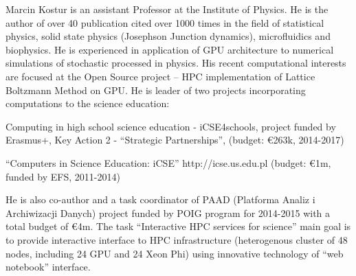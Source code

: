 \begin{participant}[type=leadPI,PM=12,salary=2000,gender=male]{Marcin Kostur}
is an assistant Professor at the Institute of Physics. He is the author of over 40
publication cited over 1000 times in the field of statistical physics,
solid state physics (Josephson Junction dynamics), microfluidics and
biophysics. He is experienced in application of GPU architecture to
numerical simulations of stochastic processed in physics. His recent
computational interests are focused at the Open Source project
 -- HPC implementation of Lattice Boltzmann Method on GPU.
He is leader of two projects incorporating computations to the science education:
\begin{compactitem}
\item Computing in high school science education - iCSE4schools,
  project funded by Erasmus+, Key Action 2 - ``Strategic Partnerships'',
  (budget: \euro{263}k, 2014-2017)
\item ``Computers in Science Education: iCSE'' http://icse.us.edu.pl
  (budget: \euro{1}m, funded by EFS, 2011-2014)
\end{compactitem}
He is also co-author and a task coordinator of PAAD (Platforma Analiz i
Archiwizacji Danych) project funded by POIG program for 2014-2015 with a total budget
of \euro{4}m. The task ``Interactive HPC services for science''
main goal is to provide interactive interface to HPC infrastructure
(heterogenous cluster of 48 nodes, including 24 GPU and 24 Xeon Phi)
using innovative technology of ``web notebook'' interface.  
\end{participant}
